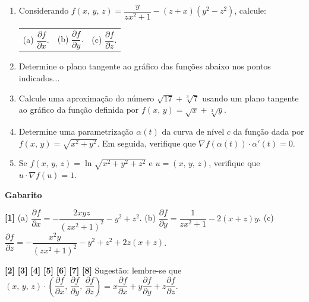 \documentclass[12pt,a4paper]{article}
\newcommand{\parcial}[2]{\dfrac{\partial #1}{\partial #2}}
\begin{document}
\begin{enumerate}

\item Considerando $f(x,\,y,\,z) = \dfrac{y}{zx^2 + 1} - (z + x)\left(y^2 - z^2\right)$, calcule:

\begin{tabular}{lll}
 (a) $\dfrac{\partial f}{\partial x}$. & (b) $\dfrac{\partial f}{\partial y}$. & (c) $\dfrac{\partial f}{\partial z}$.
\end{tabular}

\item Determine o plano tangente ao gráfico das funções abaixo nos pontos indicados...

\item Calcule uma aproximação do número $\sqrt{17} + \sqrt[3]{7}$ usando um plano tangente ao gráfico da 
função definida por $f(x,\,y) = \sqrt{x} + \sqrt[3]{y}$.

\item Determine uma parametrização $\alpha(t)$ da curva de nível $c$ da função dada por $f(x,\,y) = \sqrt{x^2 + y^2}$. Em seguida, 
verifique que $\nabla f(\alpha(t)) \cdot \alpha'(t) = 0$.

\item Se $f(x,\,y,\,z) = \ln\sqrt{x^2 + y^2 + z^2}$ e $u = (x,\,y,\,z)$, verifique que $u\cdot \nabla f(u)= 1$.

\end{enumerate}

\newpage

\begin{center}
\textbf{Gabarito}
\end{center}
\textbf{[1]} (a) $\parcial{f}{x} = -\dfrac{2xyz}{\left(zx^2 + 1\right)^2} - y^2 + z^2$. 
(b) $\parcial{f}{y} = \dfrac{1}{zx^2 + 1} - 2(x + z)y$. 
(c) $\parcial{f}{z} = - \dfrac{x^2y}{\left(zx^2 + 1\right)^2} - y^2 + z^2 + 2z(x + z)$. 

\textbf{[2]} 
\textbf{[3]} 
\textbf{[4]}  
\textbf{[5]} 
\textbf{[6]} 
\textbf{[7]} 
\textbf{[8]} Sugestão: lembre-se que $(x,\,y,\,z)\cdot \left(\parcial{f}{x},\,\parcial{f}{y},\,\parcial{f}{z}\right) = x\parcial{f}{x} + y\parcial{f}{y} + z\parcial{f}{z}$. 
\end{document}
